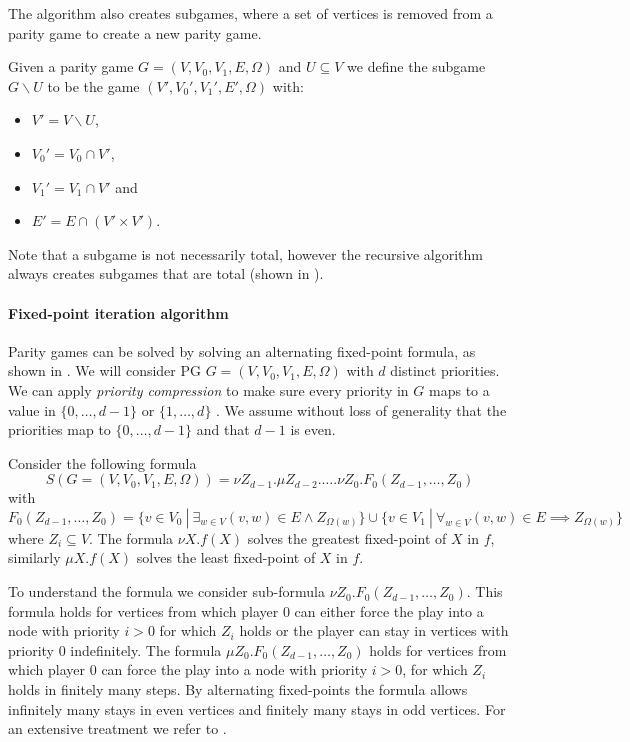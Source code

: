 The algorithm also creates subgames, where a set of vertices is removed from a parity game to create a new parity game.

\begin{definition}\cite{ZIELONKA1998135}
	\label{def_org_subgame}
	Given a parity game $G = (V,V_0,V_1, E,\Omega)$ and $U \subseteq V$ we define the subgame $G \backslash U$ to be the game $(V', V_0', V_1', E', \Omega)$ with:
	\begin{itemize}
		\item $V' = V \backslash U$,
		\item $V_0' = V_0 \cap V'$,
		\item $V_1' = V_1 \cap V'$ and
		\item $E' = E \cap (V' \times V')$.
	\end{itemize}
\end{definition}

Note that a subgame is not necessarily total, however the recursive algorithm always creates subgames that are total (shown in \cite{ZIELONKA1998135}).

\paragraph{Fixed-point iteration algorithm}
Parity games can be solved by solving an alternating fixed-point formula, as shown in \cite{WALUKIEWICZ2002311}. We will consider PG $G = (V,V_0,V_1, E, \Omega)$ with $d$ distinct priorities. We can apply \textit{priority compression} to make sure every priority in $G$ maps to a value in $\{0,\dots,d-1\}$ or $\{1, \dots, d\}$ \cite{SolvingInPractice,FPITE}. We assume without loss of generality that the priorities map to $\{0,\dots,d-1\}$ and that $d-1$ is even. 

Consider the following formula
\[ S(G = (V,V_0,V_1,E,\Omega)) = \nu Z_{d-1}. \mu Z_{d-2}. \dots . \nu Z_0. F_0(Z_{d-1},\dots,Z_0) \]
with
\[ F_0(Z_{d-1},\dots,Z_0) = \{ v \in V_0\ |\ \exists_{w\in V} (v,w) \in E \wedge Z_{\Omega(w)} \} \cup \{ v \in V_1\ |\ \forall_{w\in V} (v,w) \in E \implies Z_{\Omega(w)} \} \]
where $Z_i \subseteq V$. The formula $\nu X. f(X)$ solves the greatest fixed-point of $X$ in $f$, similarly $\mu X.f(X)$ solves the least fixed-point of $X$ in $f$.

To understand the formula we consider sub-formula $\nu Z_0. F_0(Z_{d-1},\dots,Z_0)$. This formula holds for vertices from which player $0$ can either force the play into a node with priority $i > 0$ for which $Z_i$ holds or the player can stay in vertices with priority $0$ indefinitely. The formula $\mu Z_0. F_0(Z_{d-1},\dots,Z_0)$ holds for vertices from which player $0$ can force the play into a node with priority $i > 0$, for which $Z_i$ holds in finitely many steps. By alternating fixed-points the formula allows infinitely many stays in even vertices and finitely many stays in odd vertices. For an extensive treatment we refer to \cite{WALUKIEWICZ2002311}.

